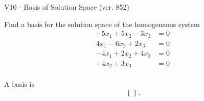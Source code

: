 \begin{exercise}
  \begin{exerciseTitle}V10 - Basis of Solution Space (ver. 852)\end{exerciseTitle}
  \begin{exerciseStatement}
    Find a basis for the solution space of the homogeneous system 
\begin{align*}
 -5 x_ 1 + 5 x_ 2 -3 x_ 3 &= 0  \\ 
  4 x_ 1 -6 x_ 2 + 2 x_ 3 &= 0  \\ 
  -4 x_ 1 + 2 x_ 2 + 4 x_ 3 &= 0  \\ 
  + 4 x_ 2 + 3 x_ 3 &= 0  \\ 
 \end{align*}


 
  \end{exerciseStatement}

  \begin{exerciseAnswer}
   A basis is   
\[\left\{\right\}.\]

  


  \end{exerciseAnswer}
\end{exercise}